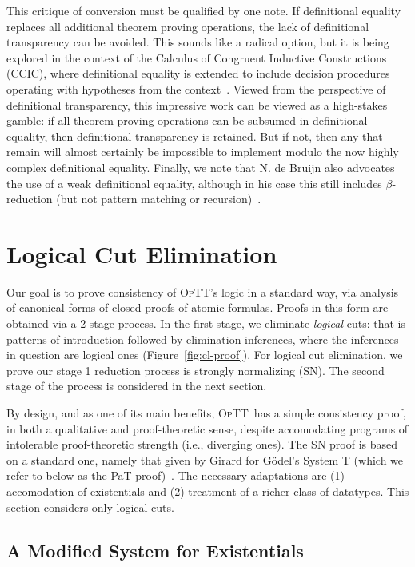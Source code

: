 \documentclass{fundam}
\newcommand{\optt}{\textsc{OpTT}}
\begin{document}
This critique of conversion must be qualified by one note.  If
definitional equality replaces all additional theorem proving
operations, the lack of definitional transparency can be avoided.
This sounds like a radical option, but it is being explored in the
context of the Calculus of Congruent Inductive Constructions (CCIC),
where definitional equality is extended to include decision procedures
operating with hypotheses from the context~\cite{blanqui+08}.  Viewed
from the perspective of definitional transparency, this impressive
work can be viewed as a high-stakes gamble: if all theorem proving
operations can be subsumed in definitional equality, then definitional
transparency is retained.  But if not, then any that remain will
almost certainly be impossible to implement modulo the now highly
complex definitional equality.  Finally, we note that N. de Bruijn
also advocates the use of a weak definitional equality, although in
his case this still includes $\beta$-reduction (but not pattern
matching or recursion)~\cite{debruijn91}.  

\section{Logical Cut Elimination}
\label{sec:cut_elim}

Our goal is to prove consistency of \optt's logic in a standard way,
via analysis of canonical forms of closed proofs of atomic formulas.
Proofs in this form are obtained via a 2-stage process.  In the first
stage, we eliminate \emph{logical} cuts: that is patterns of
introduction followed by elimination inferences, where the inferences
in question are logical ones (Figure~\ref{fig:cl-proof}).  For logical
cut elimination, we prove our stage 1 reduction process is strongly
normalizing (SN).  The second stage of the process is considered in
the next section.

By design, and as one of its main benefits, \optt\ has a simple
consistency proof, in both a qualitative and proof-theoretic sense,
despite accomodating programs of intolerable proof-theoretic strength
(i.e., diverging ones).  The SN proof is based on a standard one,
namely that given by Girard for G\"odel's System T (which we refer to
below as the PaT proof)~\cite{pat}.  The necessary adaptations are (1)
accomodation of existentials and (2) treatment of a richer class of
datatypes.  This section considers only logical cuts.

\subsection{A Modified System for Existentials}
\end{document}

